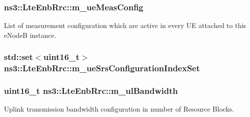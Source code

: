 \subsubsection[{\texorpdfstring{m\+\_\+ue\+Meas\+Config}{m_ueMeasConfig}}]{ ns3\+::\+Lte\+Enb\+Rrc\+::m\+\_\+ue\+Meas\+Config\hspace{0.3cm}{\ttfamily [private]}}\hypertarget{classns3_1_1LteEnbRrc_a98d0766aa6a671bb20f2996c634e6b17}{}\label{classns3_1_1LteEnbRrc_a98d0766aa6a671bb20f2996c634e6b17}
List of measurement configuration which are active in every UE attached to this e\+NodeB instance. 
\subsubsection[{\texorpdfstring{m\+\_\+ue\+Srs\+Configuration\+Index\+Set}{m_ueSrsConfigurationIndexSet}}]{\setlength{\rightskip}{0pt plus 5cm}std\+::set$<$uint16\+\_\+t$>$ ns3\+::\+Lte\+Enb\+Rrc\+::m\+\_\+ue\+Srs\+Configuration\+Index\+Set\hspace{0.3cm}{\ttfamily [private]}}\hypertarget{classns3_1_1LteEnbRrc_a1807b21ca2e25c55dcbea00ca8657aaa}{}\label{classns3_1_1LteEnbRrc_a1807b21ca2e25c55dcbea00ca8657aaa}
\subsubsection[{\texorpdfstring{m\+\_\+ul\+Bandwidth}{m_ulBandwidth}}]{\setlength{\rightskip}{0pt plus 5cm}uint16\+\_\+t ns3\+::\+Lte\+Enb\+Rrc\+::m\+\_\+ul\+Bandwidth\hspace{0.3cm}{\ttfamily [private]}}\hypertarget{classns3_1_1LteEnbRrc_a72fae86a1a284d181d9b977bf0201ed0}{}\label{classns3_1_1LteEnbRrc_a72fae86a1a284d181d9b977bf0201ed0}


Uplink transmission bandwidth configuration in number of Resource Blocks. 

